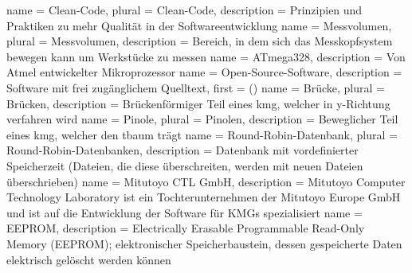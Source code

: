 {
    name = {Clean-Code},
    plural = {Clean-Code},
    description = {Prinzipien und Praktiken zu mehr Qualität in der Softwareentwicklung}
}
{
    name = {Messvolumen},
    plural = {Messvolumen},
    description = {Bereich, in dem sich das Messkopfsystem bewegen kann um Werkstücke zu messen}
}
{
    name = {ATmega328},
    description = {Von Atmel entwickelter Mikroprozessor}
}
{
    name = {Open-Source-Software},
    description = {Software mit frei zugänglichem Quelltext},
    first = { ()}
}
{
    name = {Brücke},
    plural = {Brücken},
    description = {Brückenförmiger Teil eines \gls{kmg}, welcher in y-Richtung verfahren wird}
}
{
    name = {Pinole},
    plural = {Pinolen},
    description = {Beweglicher Teil eines \gls{kmg}, welcher den \gls{tbaum} trägt}
}
{
    name = {Round-Robin-Datenbank},
    plural = {Round-Robin-Datenbanken},
    description = {Datenbank mit vordefinierter Speicherzeit (Dateien, die diese überschreiten, werden mit neuen Dateien überschrieben)}
}
{
    name = {Mitutoyo CTL GmbH},
    description = {Mitutoyo Computer Technology Laboratory ist ein Tochterunternehmen der Mitutoyo Europe GmbH und ist auf die Entwicklung der Software für KMGs spezialisiert}
}
{
    name = {EEPROM},
    description = {Electrically Erasable Programmable Read-Only Memory (EEPROM); elektronischer Speicherbaustein, dessen gespeicherte Daten elektrisch gelöscht werden können}
}
\glsfindwidesttoplevelname